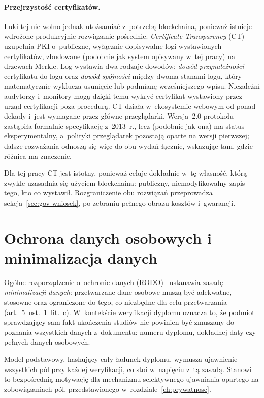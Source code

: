 \paragraph{Przejrzystość certyfikatów.} Luki tej nie wolno jednak utożsamiać
z~potrzebą blockchaina, ponieważ istnieje wdrożone produkcyjnie rozwiązanie
pośrednie. \emph{Certificate Transparency} (CT)~\cite{rfc6962} uzupełnia PKI
o~publiczne, wyłącznie dopisywalne logi wystawionych certyfikatów, zbudowane
(podobnie jak system opisywany w~tej pracy) na drzewach Merkle. Log
wystawia dwa rodzaje dowodów: \emph{dowód przynależności} certyfikatu do logu oraz
\emph{dowód spójności} między dwoma stanami logu, który matematycznie wyklucza
usunięcie lub podmianę wcześniejszego wpisu. Niezależni audytorzy i~monitory
mogą dzięki temu wykryć certyfikat wystawiony przez urząd certyfikacji poza
procedurą. CT działa w~ekosystemie webowym od ponad dekady i~jest wymagane przez
główne przeglądarki. Wersja~2.0 protokołu~\cite{rfc9162} zastąpiła formalnie
specyfikację z~2013~r., lecz (podobnie jak ona) ma status
eksperymentalny, a~polityki przeglądarek pozostają oparte na wersji
pierwszej; dalsze rozważania odnoszą się więc do obu wydań łącznie, wskazując
tam, gdzie różnica ma znaczenie.

Dla tej pracy CT jest istotny, ponieważ celuje dokładnie w~tę własność, którą
zwykle uzasadnia się użyciem blockchaina: publiczny, niemodyfikowalny zapis tego,
kto co wystawił. Rozgraniczenie obu rozwiązań przeprowadza
sekcja~\ref{sec:gov-wniosek}, po zebraniu pełnego obrazu kosztów i~gwarancji.

\section{Ochrona danych osobowych i minimalizacja danych}
\label{sec:rodo}

Ogólne rozporządzenie o~ochronie danych (RODO)~\cite{gdpr} ustanawia zasadę
\emph{minimalizacji danych}: przetwarzane dane osobowe muszą być adekwatne,
stosowne oraz ograniczone do tego, co niezbędne dla celu przetwarzania
(art.~5~ust.~1~lit.~c). W~kontekście weryfikacji dyplomu oznacza to, że podmiot
sprawdzający sam fakt ukończenia studiów nie powinien być zmuszany do poznania
wszystkich danych z~dokumentu: numeru dyplomu, dokładnej daty czy pełnych danych
osobowych.

Model podstawowy, hashujący cały ładunek dyplomu, wymusza ujawnienie wszystkich pól
przy każdej weryfikacji, co stoi w~napięciu z~tą zasadą. Stanowi to bezpośrednią
motywację dla mechanizmu selektywnego ujawniania opartego na zobowiązaniach pól,
przedstawionego w~rozdziale~\ref{ch:prywatnosc}.
